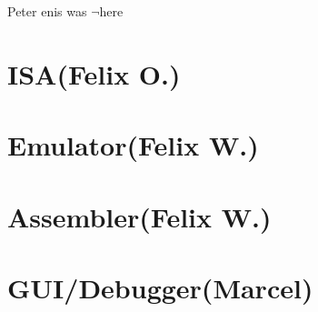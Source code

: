 Peter enis was $\neg$here

\section{ISA(Felix O.)}
\section{Emulator(Felix W.)}
\section{Assembler(Felix W.)}
\section{GUI/Debugger(Marcel)}

